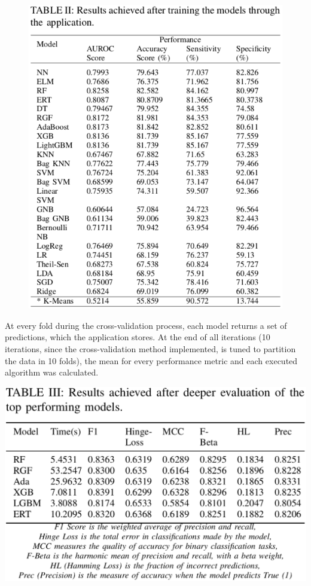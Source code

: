 \documentclass[a1paper,portrait,fontscale=0.43]{baposter}
\begin{document}
\begin{poster}
{\begin{figure}
    \vspace{10pt}
    \begin{center}
        \includegraphics[width=\linewidth]{r1}
    \end{center}
\end{figure}

At every fold during the cross-validation process, each model returns a set of predictions, which the application stores. At the end of all iterations (10 iterations, since the cross-validation method implemented, is tuned to partition the data in 10 folds), the mean for every performance metric and each executed algorithm was calculated.

\hspace{0pt}\includegraphics[width=\linewidth]{r2}

}
\end{poster}
\end{document}
